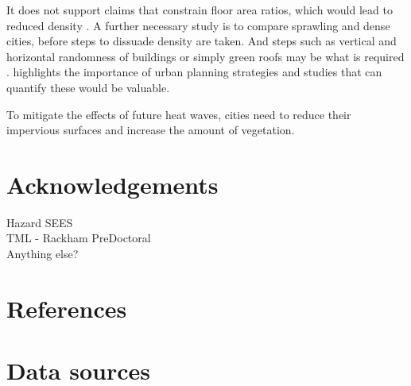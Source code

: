 \documentclass[final,3p,times,twocolumn,sort&compress]{elsarticle}
\begin{document}
It does not support claims that constrain floor area ratios, which would lead to reduced density \cite{Chun2017-mm}. 
A further necessary study is to compare sprawling and dense cities, before steps to dissuade density are taken. 
And steps such as vertical and horizontal randomness of buildings or simply green roofs may be what is required \cite{Gago2013-ta}.
highlights the importance of urban planning strategies and studies that can quantify these would be valuable.

To mitigate the effects of future heat waves, cities need to reduce their impervious surfaces and increase the amount of vegetation.


\section*{Acknowledgements}
Hazard SEES\\
TML - Rackham PreDoctoral\\
Anything else?


\section*{References}



\newpage
\onecolumn
\appendix

\section{Data sources}
\end{document}
